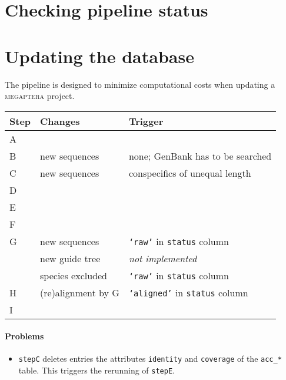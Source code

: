 \documentclass[12pt]{article}
\begin{document}
\begin{description}
\item[ ] 
\end{description}


\section{Checking pipeline status}

\section{Updating the database}

The pipeline is designed to minimize computational costs when updating a \textsc{megaptera} project.
\vspace{\baselineskip}


\begin{tabular}{lll}
\hline
Step&Changes&Trigger\\
\hline
A&&\\
\hline
B&new sequences&none; GenBank has to be searched\\
\hline
C&new sequences&conspecifics of unequal length\\
\hline
D&&\\
\hline
E&&\\
\hline
F&&\\
\hline
G&new sequences&\texttt{`raw'} in \texttt{status} column\\
 &new guide tree&\emph{not implemented}\\
  &species excluded&\texttt{`raw'} in \texttt{status} column\\
\hline
H&(re)alignment by G&\texttt{`aligned'} in \texttt{status} column\\
\hline
I&&\\
\hline
\end{tabular}

\paragraph{Problems}
\begin{itemize}
\item \texttt{stepC} deletes entries the attributes \texttt{identity} and \texttt{coverage} of the \texttt{acc\_*} table. This triggers the rerunning of \texttt{stepE}.
\end{itemize}
\end{document}
